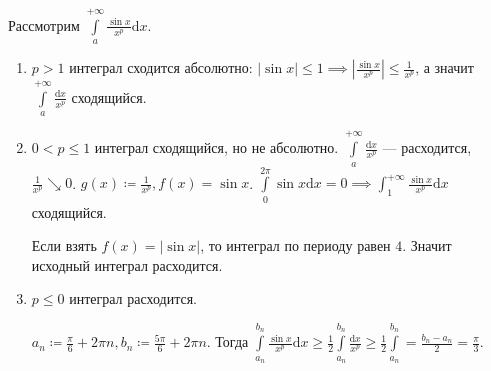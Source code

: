 \begin{example}
    Рассмотрим $\int\limits_a^{+\infty} \frac{\sin x}{x^p} \mathrm{d}x$.
    \begin{enumerate}
    \item $p > 1$ интеграл сходится абсолютно:  $|\sin x| \le 1 \implies \left| \frac{\sin x}{x^p} \right| \le \frac{1}{x^p}$, а значит $\int\limits_a^{+\infty} \frac{\mathrm{d}x}{x^p}$ сходящийся.
    \item $0 < p \le 1$ интеграл сходящийся, но не абсолютно. $\int\limits_a^{+\infty} \frac{\mathrm{d}x}{x^p}$ --- расходится, $\frac{1}{x^p} \searrow 0$. $g(x) \coloneqq \frac{1}{x^p}, f(x) = \sin x$. $\int\limits_0^{2\pi} \sin x \mathrm{d}x = 0 \implies \int_1^{+\infty} \frac{\sin x}{x^p} \mathrm{d}x$ сходящийся.

        Если взять $f(x) = |\sin x|$, то интеграл по периоду равен  $4$. Значит исходный интеграл расходится.
    \item $p \le 0$ интеграл расходится. 

        $a_n \coloneqq \frac{\pi}{6} + 2\pi n, b_n \coloneqq \frac{5\pi}{6} + 2\pi n$. Тогда $\int\limits_{a_n}^{b_n} \frac{\sin x}{x^p} \mathrm{d}x \ge \frac{1}{2} \int\limits_{a_n}^{b_n} \frac{\mathrm{d}x}{x^p} \ge \frac{1}{2} \int\limits_{a_n}^{b_n} = \frac{b_n - a_n}{2} = \frac{\pi}{3}$.
    \end{enumerate}
\end{example}
